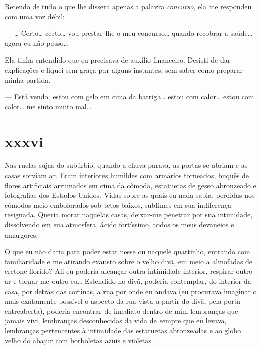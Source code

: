 Retendo de tudo o que lhe dissera apenas a palavra \textit{concurso}, ela me
respondeu com uma voz débil:

--- \ldots{} Certo\ldots{} certo\ldots{} vou prestar-lhe o meu concurso\ldots
     {} quando recobrar a saúde\ldots{} agora eu não posso\ldots{}

Ela tinha entendido que eu precisava de auxílio financeiro. Desisti de dar
explicações e fiquei sem graça por alguns instantes, sem saber como preparar
minha partida.


--- Está vendo, estou com gelo em cima da barriga\ldots{} estou com
    calor\ldots{} estou com calor\ldots{} me sinto muito mal\ldots{}



\section{xxxvi} 

 

Nas ruelas sujas do subúrbio, quando a chuva parava, as portas se abriam e as
casas sorviam ar. Eram interiores humildes com armários torneados, buquês de
flores artificiais arrumados em cima da cômoda, estatuetas de gesso
abronzeado e fotografias dos Estados Unidos. Vidas sobre as quais eu nada
sabia, perdidas nos cômodos meio embolorados sob tetos baixos, sublimes em
sua indiferença resignada. Queria morar naquelas casas, deixar-me penetrar
por sua intimidade, dissolvendo em sua atmosfera, ácido fortíssimo, todos os
meus devaneios e amargores.

O que eu não daria para poder estar nesse ou naquele quartinho, entrando com
familiaridade e me atirando exausto sobre o velho divã, em meio a almofadas
de cretone florido? Ali eu poderia alcançar outra intimidade interior,
respirar outro ar e tornar-me outro eu\ldots{} Estendido no divã, poderia
contemplar, do interior da casa, por detrás das cortinas, a rua por onde eu
andava (eu procurava imaginar o mais exatamente possível o aspecto da rua
vista a partir do divã, pela porta entreaberta), poderia encontrar de
imediato dentro de mim lembranças que jamais vivi, lembranças desconhecidas
da vida de sempre que eu levava, lembranças pertencentes à intimidade das
estatuetas abronzeadas e ao globo velho do abajur com borboletas azuis e
violetas.

